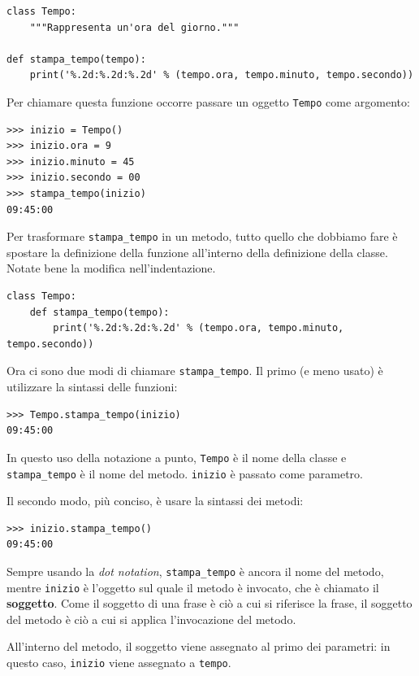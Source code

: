 \documentclass[10pt]{book}
\begin{document}
\begin{verbatim}
class Tempo:
    """Rappresenta un'ora del giorno."""

def stampa_tempo(tempo):
    print('%.2d:%.2d:%.2d' % (tempo.ora, tempo.minuto, tempo.secondo))
\end{verbatim}
%
Per chiamare questa funzione occorre passare un oggetto {\tt Tempo} come    argomento:

\begin{verbatim}
>>> inizio = Tempo()
>>> inizio.ora = 9
>>> inizio.minuto = 45
>>> inizio.secondo = 00
>>> stampa_tempo(inizio)
09:45:00
\end{verbatim}
%
Per trasformare \verb"stampa_tempo" in un metodo, tutto quello che dobbiamo fare è spostare la definizione della funzione all'interno della definizione della classe. Notate bene la modifica nell'indentazione.

\begin{verbatim}
class Tempo:
    def stampa_tempo(tempo):
        print('%.2d:%.2d:%.2d' % (tempo.ora, tempo.minuto, tempo.secondo))
\end{verbatim}
%
Ora ci sono due modi di chiamare \verb"stampa_tempo".  Il primo (e meno usato) è utilizzare la sintassi delle funzioni:


\begin{verbatim}
>>> Tempo.stampa_tempo(inizio)
09:45:00
\end{verbatim}
%
In questo uso della notazione a punto, {\tt Tempo} è il nome della classe e
 \verb"stampa_tempo" è il nome del metodo.  {\tt inizio} è passato come parametro.

Il secondo modo, più conciso, è usare la sintassi dei metodi:

\begin{verbatim}
>>> inizio.stampa_tempo()
09:45:00
\end{verbatim}
%
Sempre usando la {\em dot notation}, \verb"stampa_tempo" è ancora il nome del metodo, mentre {\tt inizio} è l'oggetto sul quale il metodo è invocato, che è chiamato il {\bf soggetto}.  Come il soggetto di una frase è ciò a cui si riferisce la frase, il soggetto del metodo è ciò a cui si applica l'invocazione del metodo.

All'interno del metodo, il soggetto viene assegnato al primo dei parametri: in questo caso, {\tt inizio} viene assegnato a {\tt tempo}.
\end{document}
